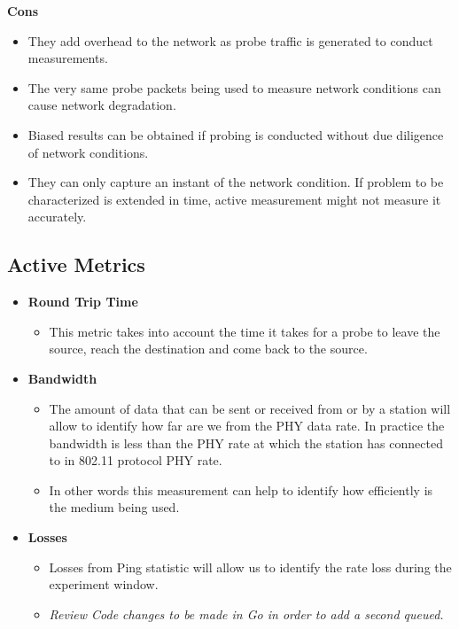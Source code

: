 \textbf{Cons}
\begin{itemize}
	\item They add overhead to the network as probe traffic is generated to conduct measurements.
	\item The very same probe packets being used to measure network conditions can cause network degradation.
	\item Biased results can be obtained if probing is conducted without due diligence of network conditions.
	\item They can only capture an instant of the network condition. If problem to be characterized is extended in time, active measurement might not measure it accurately.
\end{itemize}

\subsection*{Active Metrics}

\begin{itemize}
	\item \textbf{Round Trip Time}
	\begin{itemize}
		\item This metric takes into account the time it takes for a probe to leave the source, reach the destination and come back to the source. 
	\end{itemize}
	
	\item \textbf{Bandwidth}
	\begin{itemize}
		\item The amount of data that can be sent or received from or by a station will allow to identify how far are we from the PHY data rate. In practice the bandwidth is less than the PHY rate at which the station has connected to in 802.11 protocol PHY rate.
		\item In other words this measurement can help to identify how efficiently is the medium being used.
	\end{itemize}
	\item \textbf{Losses}
	\begin{itemize}
		\item Losses from Ping statistic will allow us to identify the rate loss during the experiment window.
		\item \emph{Review Code changes to be made in Go in order to add a second queued.}
	\end{itemize}
\end{itemize}

